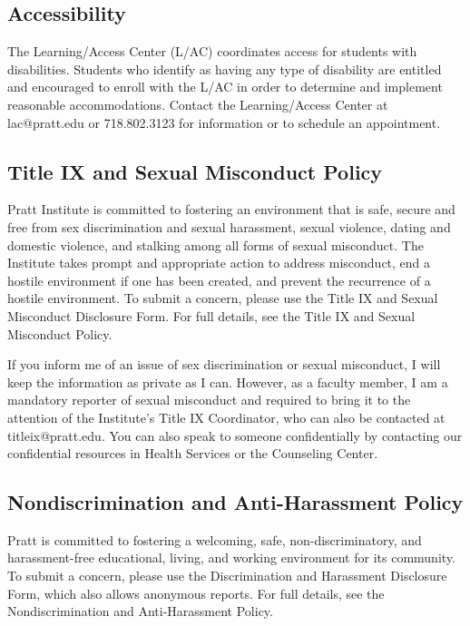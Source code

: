 \documentclass[12pt]{article}
\begin{document}
\subsection*{Accessibility}
\label{sec:org2525902}

The Learning/Access Center (L/AC) coordinates access for students with
disabilities. Students who identify as having any type of disability
are entitled and encouraged to enroll with the L/AC in order to
determine and implement reasonable accommodations. Contact the
Learning/Access Center at lac@pratt.edu or 718.802.3123 for
information or to schedule an appointment.

\subsection*{Title IX and Sexual Misconduct Policy}
\label{sec:org2f54ea8}

Pratt Institute is committed to fostering an environment that is safe,
secure and free from sex discrimination and sexual harassment, sexual
violence, dating and domestic violence, and stalking among all forms
of sexual misconduct. The Institute takes prompt and appropriate
action to address misconduct, end a hostile environment if one has
been created, and prevent the recurrence of a hostile environment. To
submit a concern, please use the Title IX and Sexual Misconduct
Disclosure Form. For full details, see the Title IX and Sexual
Misconduct Policy.

If you inform me of an issue of sex discrimination or sexual
misconduct, I will keep the information as private as I can. However,
as a faculty member, I am a mandatory reporter of sexual misconduct
and required to bring it to the attention of the Institute’s Title IX
Coordinator, who can also be contacted at titleix@pratt.edu. You can
also speak to someone confidentially by contacting our confidential
resources in Health Services or the Counseling Center.

\subsection*{Nondiscrimination and Anti-Harassment Policy}
\label{sec:orgd61f6a9}

Pratt is committed to fostering a welcoming, safe, non-discriminatory,
and harassment-free educational, living, and working environment for
its community. To submit a concern, please use the Discrimination and
Harassment Disclosure Form, which also allows anonymous reports. For
full details, see the Nondiscrimination and Anti-Harassment Policy.
\end{document}
